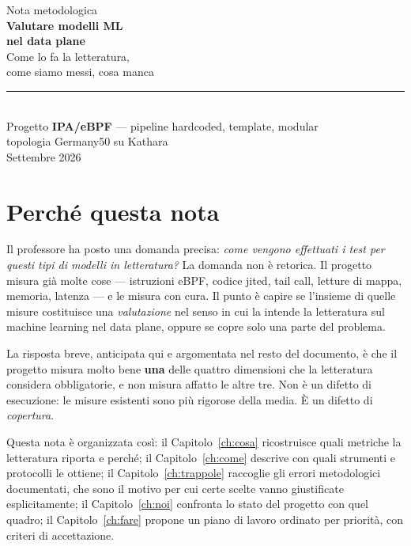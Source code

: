 \documentclass[11pt,a4paper,oneside]{report}
\begin{document}
\begin{titlepage}
\centering
\vspace*{3cm}
{\color{soft}\large Nota metodologica}\\[1.2cm]
{\color{accent}\Huge\bfseries Valutare modelli ML\\[0.3cm] nel data plane}\\[0.8cm]
{\Large Come lo fa la letteratura,\\ come siamo messi, cosa manca}\\[2.5cm]
\rule{0.6\linewidth}{0.8pt}\\[0.8cm]
{\large Progetto \textbf{IPA/eBPF} --- pipeline hardcoded, template, modular}\\[0.3cm]
{\color{soft} topologia Germany50 su Kathara}\\[3cm]
{\color{soft} Settembre 2026}
\end{titlepage}

\tableofcontents
\clearpage

\chapter{Perché questa nota}

Il professore ha posto una domanda precisa: \emph{come vengono effettuati
i test per questi tipi di modelli in letteratura?} La domanda non è
retorica. Il progetto misura già molte cose --- istruzioni eBPF, codice
jited, tail call, letture di mappa, memoria, latenza --- e le misura con
cura. Il punto è capire se l'insieme di quelle misure costituisce una
\emph{valutazione} nel senso in cui la intende la letteratura sul
machine learning nel data plane, oppure se copre solo una parte del
problema.

La risposta breve, anticipata qui e argomentata nel resto del
documento, è che il progetto misura molto bene \textbf{una} delle
quattro dimensioni che la letteratura considera obbligatorie, e non
misura affatto le altre tre. Non è un difetto di esecuzione: le misure
esistenti sono più rigorose della media. È un difetto di
\emph{copertura}.

Questa nota è organizzata così: il Capitolo~\ref{ch:cosa} ricostruisce
quali metriche la letteratura riporta e perché; il
Capitolo~\ref{ch:come} descrive con quali strumenti e protocolli le
ottiene; il Capitolo~\ref{ch:trappole} raccoglie gli errori
metodologici documentati, che sono il motivo per cui certe scelte
vanno giustificate esplicitamente; il Capitolo~\ref{ch:noi} confronta
lo stato del progetto con quel quadro; il Capitolo~\ref{ch:fare}
propone un piano di lavoro ordinato per priorità, con criteri di
accettazione.
\end{document}
